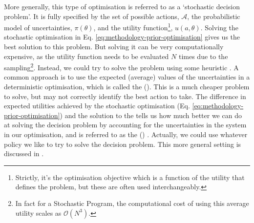 More generally, this type of optimisation is referred to as a `stochastic decision problem'. It is fully specified by the set of possible actions, $\mathcal{A}$, the probabilistic model of uncertainties, $\pi(\theta)$, and the utility function\footnote{Strictly, it's the optimisation objective which is a function of the utility that defines the problem, but these are often used interchangeably.}, $u(a,\theta)$. Solving the stochastic optimisation in Eq. \ref{eq:methodology-prior-optimisation} gives us the best solution to this problem. But solving it can be very computationally expensive, as the utility function needs to be evaluated $N$ times due to the sampling\footnote{In fact for a Stochastic Program, the computational cost of using this average utility scales as $\mathcal{O}(N^3)$.}. Instead, we could try to solve the problem using some heuristic \citep{pickering2016ComparisonMetaheuristicLinear}. A common approach is to use the expected (average) values of the uncertainties in a deterministic optimisation, which is called the  (). This is a much cheaper problem to solve, but may not correctly identify the best action to take. The difference in expected utilities achieved by the stochastic optimisation (Eq. \ref{eq:methodology-prior-optimisation}) and the solution to the  tells us how much better we can do at solving the decision problem by accounting for the uncertainties in the system in our optimisation, and is referred to as the  () \citep{bistline2015ElectricSectorCapacity}. Actually, we could use whatever policy we like to try to solve the decision problem. This more general setting is discussed in .\\

